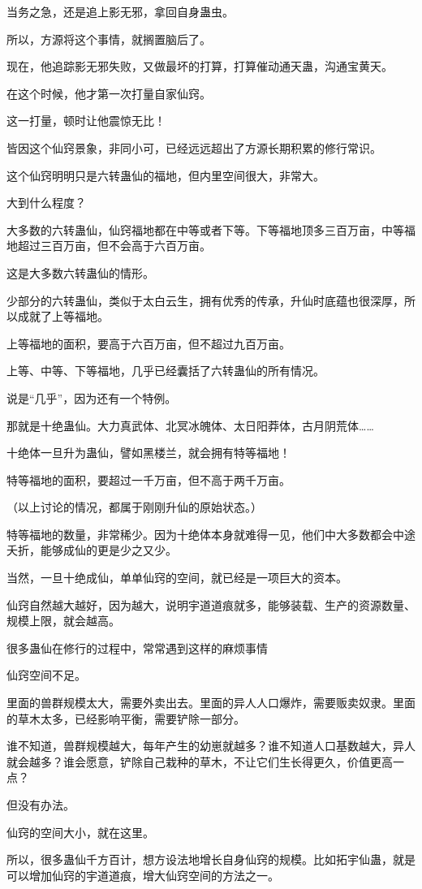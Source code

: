 \begin{this_body}
当务之急，还是追上影无邪，拿回自身蛊虫。

所以，方源将这个事情，就搁置脑后了。

现在，他追踪影无邪失败，又做最坏的打算，打算催动通天蛊，沟通宝黄天。

在这个时候，他才第一次打量自家仙窍。

这一打量，顿时让他震惊无比！

皆因这个仙窍景象，非同小可，已经远远超出了方源长期积累的修行常识。

这个仙窍明明只是六转蛊仙的福地，但内里空间很大，非常大。

大到什么程度？

大多数的六转蛊仙，仙窍福地都在中等或者下等。下等福地顶多三百万亩，中等福地超过三百万亩，但不会高于六百万亩。

这是大多数六转蛊仙的情形。

少部分的六转蛊仙，类似于太白云生，拥有优秀的传承，升仙时底蕴也很深厚，所以成就了上等福地。

上等福地的面积，要高于六百万亩，但不超过九百万亩。

上等、中等、下等福地，几乎已经囊括了六转蛊仙的所有情况。

说是“几乎”，因为还有一个特例。

那就是十绝蛊仙。大力真武体、北冥冰魄体、太日阳莽体，古月阴荒体……

十绝体一旦升为蛊仙，譬如黑楼兰，就会拥有特等福地！

特等福地的面积，要超过一千万亩，但不高于两千万亩。

（以上讨论的情况，都属于刚刚升仙的原始状态。）

特等福地的数量，非常稀少。因为十绝体本身就难得一见，他们中大多数都会中途夭折，能够成仙的更是少之又少。

当然，一旦十绝成仙，单单仙窍的空间，就已经是一项巨大的资本。

仙窍自然越大越好，因为越大，说明宇道道痕就多，能够装载、生产的资源数量、规模上限，就会越高。

很多蛊仙在修行的过程中，常常遇到这样的麻烦事情

仙窍空间不足。

里面的兽群规模太大，需要外卖出去。里面的异人人口爆炸，需要贩卖奴隶。里面的草木太多，已经影响平衡，需要铲除一部分。

谁不知道，兽群规模越大，每年产生的幼崽就越多？谁不知道人口基数越大，异人就会越多？谁会愿意，铲除自己栽种的草木，不让它们生长得更久，价值更高一点？

但没有办法。

仙窍的空间大小，就在这里。

所以，很多蛊仙千方百计，想方设法地增长自身仙窍的规模。比如拓宇仙蛊，就是可以增加仙窍的宇道道痕，增大仙窍空间的方法之一。

\end{this_body}

